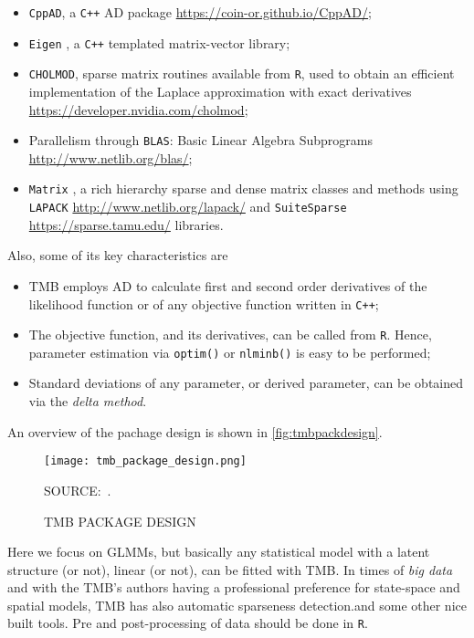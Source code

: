 \begin{itemize}
\item \texttt{CppAD}, a \texttt{C++} AD package
  \url{https://coin-or.github.io/CppAD/};
\item \texttt{Eigen} \cite{eigen}, a \texttt{C++} templated
  matrix-vector library;
\item \texttt{CHOLMOD}, sparse matrix routines available from
  \texttt{R}, used to obtain an efficient implementation of the Laplace
  approximation with exact derivatives
  \url{https://developer.nvidia.com/cholmod};
\item Parallelism through \texttt{BLAS}: Basic Linear Algebra
  Subprograms \url{http://www.netlib.org/blas/};
\item \texttt{Matrix} \cite{Matrix}, a rich hierarchy sparse and dense
  matrix classes and methods using \texttt{LAPACK}
  \url{http://www.netlib.org/lapack/} and \texttt{SuiteSparse}
  \url{https://sparse.tamu.edu/} libraries.
\end{itemize}
Also, some of its key characteristics are
\begin{itemize}
\item TMB employs AD to calculate first and second order derivatives of
  the likelihood function or of any objective function written in
  \texttt{C++};
\item The objective function, and its derivatives, can be called from
  \texttt{R}. Hence, parameter estimation via \texttt{optim()} or
  \texttt{nlminb()} is easy to be performed;
\item Standard deviations of any parameter, or derived parameter, can be
  obtained via the \textit{delta method}.
\end{itemize}
An overview of the pachage design is shown in
\autoref{fig:tmbpackdesign}.

\begin{figure}[H]
  \setlength{\abovecaptionskip}{.0001pt}
  \caption{TMB PACKAGE DESIGN}
  \vspace{0.3cm} \centering
  \texttt{[image: tmb\_package\_design.png]}
  \\
  \vspace{0.1cm}
  \begin{footnotesize}
    SOURCE:~.
  \end{footnotesize}
  \label{fig:tmbpackdesign}
\end{figure}

Here we focus on GLMMs, but basically any statistical model with a
latent structure (or not), linear (or not), can be fitted with TMB. In
times of \textit{big data} and with the TMB's authors having a
professional preference for state-space and spatial models, TMB has
also automatic sparseness detection.and some other nice built tools. Pre
and post-processing of data should be done in \texttt{R}.

